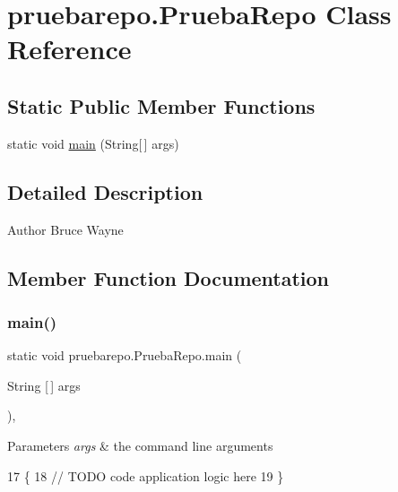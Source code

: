 \hypertarget{classpruebarepo_1_1_prueba_repo}{}\section{pruebarepo.\+Prueba\+Repo Class Reference}
\label{classpruebarepo_1_1_prueba_repo}
\subsection*{Static Public Member Functions}
\begin{DoxyCompactItemize}
\item 
static void \mbox{\hyperlink{classpruebarepo_1_1_prueba_repo_a77093620f30dc2631fbfe34aa7bd9fda}{main}} (String\mbox{[}$\,$\mbox{]} args)
\end{DoxyCompactItemize}


\subsection{Detailed Description}
\begin{DoxyAuthor}{Author}
Bruce Wayne 
\end{DoxyAuthor}


\subsection{Member Function Documentation}
\mbox{\label{classpruebarepo_1_1_prueba_repo_a77093620f30dc2631fbfe34aa7bd9fda}} 
\subsubsection{\texorpdfstring{main()}{main()}}
{\footnotesize\ttfamily static void pruebarepo.\+Prueba\+Repo.\+main (\begin{DoxyParamCaption}\item[{String \mbox{[}$\,$\mbox{]}}]{args }\end{DoxyParamCaption})\hspace{0.3cm}{\ttfamily [inline]}, {\ttfamily [static]}}


\begin{DoxyParams}{Parameters}
{\em args} & the command line arguments \\
\hline
\end{DoxyParams}

\begin{DoxyCode}
17                                            \{
18         \textcolor{comment}{// TODO code application logic here}
19     \}
\end{DoxyCode}
